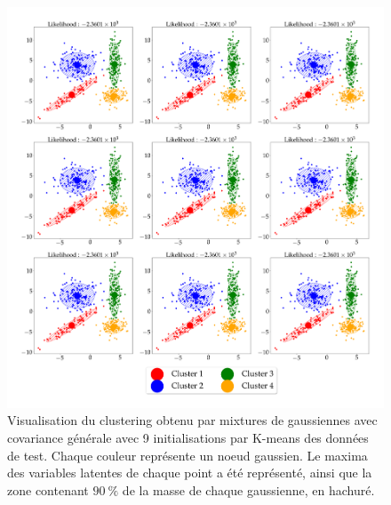 \documentclass[12pt,a4paper,onecolumn]{article}
\begin{document}
\begin{figure}[H]
	\centering
	\includegraphics[width = \textwidth]{4_d_2}
	\caption{Visualisation du clustering obtenu par mixtures de gaussiennes avec covariance générale avec 9 initialisations par K-means des données de test. Chaque couleur représente un noeud gaussien. Le maxima des variables latentes de chaque point a été représenté, ainsi que la zone contenant \(90~\%\) de la masse de chaque gaussienne, en hachuré.}
	\label{fig_4_d_2}
\end{figure}
\end{document}
